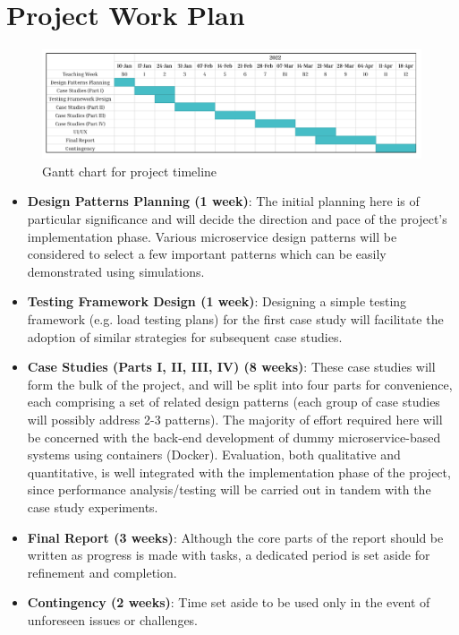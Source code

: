 \section{Project Work Plan}

\begin{figure}[H]
  \centering
  \includegraphics[width=0.9\linewidth]{./assets/images/work-plan-gantt}
  \caption{Gantt chart for project timeline}
  \label{fig:work-plan-gantt}
\end{figure}

\begin{itemize}
  \item \textbf{Design Patterns Planning (1 week)}: The initial planning here is of particular significance and will decide the direction and pace of the project's implementation phase. Various microservice design patterns will be considered to select a few important patterns which can be easily demonstrated using simulations.

  \item \textbf{Testing Framework Design (1 week)}: Designing a simple testing framework (e.g. load testing plans) for the first case study will facilitate the adoption of similar strategies for subsequent case studies.

  \item \textbf{Case Studies (Parts I, II, III, IV) (8 weeks)}: These case studies will form the bulk of the project, and will be split into four parts for convenience, each comprising a set of related design patterns (each group of case studies will possibly address 2-3 patterns). The majority of effort required here will be concerned with the back-end development of dummy microservice-based systems using containers (Docker). Evaluation, both qualitative and quantitative, is well integrated with the implementation phase of the project, since performance analysis/testing will be carried out in tandem with the case study experiments.

  \item \textbf{Final Report (3 weeks)}: Although the core parts of the report should be written as progress is made with tasks, a dedicated period is set aside for refinement and completion.
      
  \item \textbf{Contingency (2 weeks)}: Time set aside to be used only in the event of unforeseen issues or challenges.
\end{itemize}

